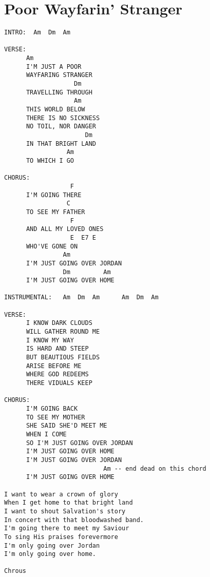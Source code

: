 \documentclass[leqno]{memoir}
\begin{document}
\chapter{Poor Wayfarin' Stranger}
\begin{verbatim}
INTRO:  Am  Dm  Am

VERSE:
      Am
      I'M JUST A POOR 
      WAYFARING STRANGER
                   Dm
      TRAVELLING THROUGH
                   Am
      THIS WORLD BELOW
      THERE IS NO SICKNESS
      NO TOIL, NOR DANGER
                      Dm
      IN THAT BRIGHT LAND
                 Am
      TO WHICH I GO

CHORUS:
                  F
      I'M GOING THERE
                 C
      TO SEE MY FATHER
                  F
      AND ALL MY LOVED ONES
                  E  E7 E
      WHO'VE GONE ON
                Am
      I'M JUST GOING OVER JORDAN
                Dm         Am
      I'M JUST GOING OVER HOME

INSTRUMENTAL:   Am  Dm  Am      Am  Dm  Am 

VERSE:
      I KNOW DARK CLOUDS
      WILL GATHER ROUND ME
      I KNOW MY WAY
      IS HARD AND STEEP
      BUT BEAUTIOUS FIELDS
      ARISE BEFORE ME
      WHERE GOD REDEEMS
      THERE VIDUALS KEEP

CHORUS:
      I'M GOING BACK
      TO SEE MY MOTHER
      SHE SAID SHE'D MEET ME
      WHEN I COME
      SO I'M JUST GOING OVER JORDAN
      I'M JUST GOING OVER HOME
      I'M JUST GOING OVER JORDAN
                           Am -- end dead on this chord
      I'M JUST GOING OVER HOME

I want to wear a crown of glory
When I get home to that bright land
I want to shout Salvation's story
In concert with that bloodwashed band.
I'm going there to meet my Saviour
To sing His praises forevermore
I'm only going over Jordan
I'm only going over home.

Chrous
\end{verbatim}
\newpage
\end{document}
